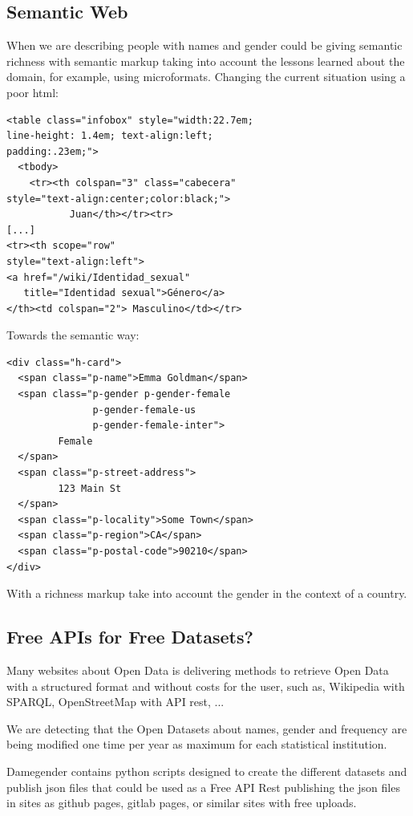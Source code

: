 \documentclass[a4paper]{article}
\begin{document}
\subsection{Semantic Web}
\label{sec:semantic}

When we are describing people with names and gender could be giving
semantic richness with semantic markup taking into account the lessons
learned about the domain, for example, using microformats. Changing the
current situation using a poor html:

\begin{verbatim}
<table class="infobox" style="width:22.7em;
line-height: 1.4em; text-align:left;
padding:.23em;">
  <tbody>
    <tr><th colspan="3" class="cabecera"
style="text-align:center;color:black;">
           Juan</th></tr><tr>
[...]
<tr><th scope="row"
style="text-align:left">
<a href="/wiki/Identidad_sexual"
   title="Identidad sexual">Género</a>
</th><td colspan="2"> Masculino</td></tr>
\end{verbatim}

Towards the semantic way:

\begin{verbatim}
<div class="h-card">
  <span class="p-name">Emma Goldman</span>
  <span class="p-gender p-gender-female
               p-gender-female-us
               p-gender-female-inter">
         Female
  </span>
  <span class="p-street-address">
         123 Main St
  </span>
  <span class="p-locality">Some Town</span>
  <span class="p-region">CA</span>
  <span class="p-postal-code">90210</span>
</div>
\end{verbatim}

With a richness markup take into account the gender in the context of
a country.

\subsection{Free APIs for Free Datasets?}
\label{sec:freeapis}

Many websites about Open Data is delivering methods to retrieve Open
Data with a structured format and without costs for the user, such as,
Wikipedia with SPARQL, OpenStreetMap with API rest, ...

We are detecting that the Open Datasets about names, gender and
frequency are being modified one time per year as maximum for each
statistical institution.

Damegender contains python scripts designed to create the
different datasets and publish json files that could be used as a Free
API Rest publishing the json files in sites as github pages, gitlab
pages, or similar sites with free uploads.
\end{document}
